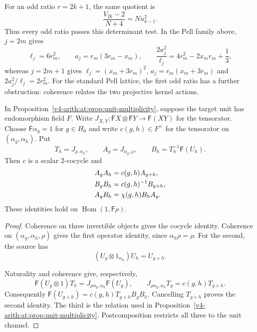 For an odd ratio $r=2k+1$, the same quotient is
\[
 \frac{V_{2k}-2}{N+4}=N u_{k-1}^2.
\]
Thus every odd ratio passes this determinant test. In the Pell family
above, $j=2m$ gives
\[
 \ell_j=6r_m^2,\qquad a_j=r_m(3r_m-x_m),\qquad
 \frac{2a_j^2}{\ell_j}=4r_m^2-2x_mr_m+\frac13,
\]
whereas $j=2m+1$ gives $\ell_j=(x_m+3r_m)^2$,
$a_j=r_m(x_m+3r_m)$ and $2a_j^2/\ell_j=2r_m^2$.
For the standard Pell lattice, the first odd ratio has a further
obstruction: coherence relates the two projective kernel actions.


\begin{lemma}
\label{v4-arith:at:lem:kernel-cocycles}
In Proposition~\ref{v4-arith:at:prop:unit-multiplicity}, suppose the target
unit has endomorphism field $F$. Write
$J_{X,Y}:\mathsf F X\otimes\mathsf F Y\to\mathsf F(XY)$ for
the tensorator. Choose $\mathsf F\alpha_g=1$ for
$g\in H_0$ and write $c(g,h)\in F^\times$ for the tensorator on
$(\alpha_g,\alpha_h)$. Put
\[
 T_h=J_{\rho,\alpha_h},\qquad
 A_g=J_{\alpha_g,\rho},\qquad
 B_h=T_h^{-1}\mathsf F(U_h).
\]
Then $c$ is a scalar $2$-cocycle and
\begin{align}
 A_gA_h&=c(g,h)A_{g+h},\notag\\
 B_gB_h&=c(g,h)^{-1}B_{g+h},\notag\\
 A_gB_h&=\chi(g,h)B_hA_g.
 \label{v4-arith:at:eq:kernel-cocycles}
\end{align}
These identities hold on $\operatorname{Hom}(1,\mathsf F\rho)$.
\end{lemma}
\begin{proof}
Coherence on three invertible objects gives the cocycle identity.
Coherence on $(\alpha_g,\alpha_h,\rho)$ gives the first operator
identity, since $\alpha_h\rho=\rho$. For the second, the source has
\[
 (U_g\otimes1_{\alpha_h})U_h=U_{g+h}.
\]

Naturality and coherence give, respectively,
\[
 \mathsf F(U_g\otimes1)T_h
       =J_{\rho\alpha_g,\alpha_h}\mathsf F(U_g),\qquad
 J_{\rho\alpha_g,\alpha_h}T_g=c(g,h)T_{g+h}.
\]
Consequently $\mathsf F(U_{g+h})=c(g,h)T_{g+h}B_gB_h$.
Cancelling $T_{g+h}$ proves the second identity. The third is the
relation used in Proposition~\ref{v4-arith:at:prop:unit-multiplicity}.
Postcomposition restricts all three to the unit channel.
\end{proof}

